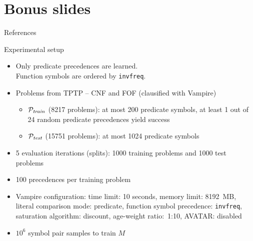 \documentclass{beamer}
\begin{document}
\section{Bonus slides}

\begin{frame}[noframenumbering]
\sectionpage
\end{frame}

\begin{frame}[noframenumbering]{References}


\end{frame}

\begin{frame}[noframenumbering]{Experimental setup}
\begin{itemize}
	\item Only predicate precedences are learned. \\
	Function symbols are ordered by \texttt{invfreq}.
	\item Problems from TPTP \cite{Sut17} -- CNF and FOF (clausified with Vampire)
	\begin{itemize}
		\item $\mathcal{P}_{\mathit{train}}$ (8217 problems):
		at most 200 predicate symbols,
		at least 1 out of 24 random predicate precedences yield success
		\item $\mathcal{P}_{\mathit{test}}$ (15751 problems):
		at most 1024 predicate symbols
	\end{itemize}
	\item 5 evaluation iterations (splits): 1000 training problems and 1000 test problems
	\item 100 precedences per training problem
	\item Vampire configuration:
	time limit: 10 seconds, memory limit: 8192~MB, literal comparison mode: predicate, function symbol
	precedence: \texttt{invfreq}, saturation algorithm: discount, age-weight ratio:~1:10, AVATAR: disabled
	\item $10^6$ symbol pair samples to train $M$
\end{itemize}
\end{frame}
\end{document}
